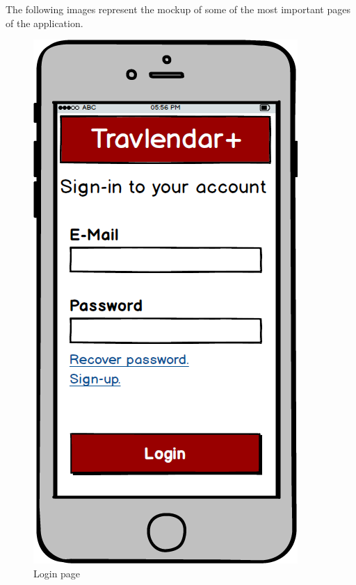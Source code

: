 The following images represent the mockup of some of the most important pages of the application.\\
\begin{figure}[!htb]

\begin{minipage}[b]{0.4\textwidth}
	\centering
	\includegraphics[scale=0.3]{images/login}
	\caption{Login page}
	\label{ref:login}
\end{minipage}
\hfill
\begin{minipage}[b]{0.4\textwidth}
	\centering

\end{minipage}
\end{figure}
